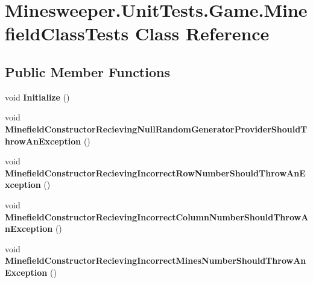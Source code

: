 \hypertarget{class_minesweeper_1_1_unit_tests_1_1_game_1_1_minefield_class_tests}{\section{Minesweeper.\+Unit\+Tests.\+Game.\+Minefield\+Class\+Tests Class Reference}
\label{class_minesweeper_1_1_unit_tests_1_1_game_1_1_minefield_class_tests}
}
\subsection*{Public Member Functions}
\begin{DoxyCompactItemize}
\item 
\hypertarget{class_minesweeper_1_1_unit_tests_1_1_game_1_1_minefield_class_tests_a052364795ce9d9654108dafa6000f8b9}{void {\bfseries Initialize} ()}\label{class_minesweeper_1_1_unit_tests_1_1_game_1_1_minefield_class_tests_a052364795ce9d9654108dafa6000f8b9}

\item 
\hypertarget{class_minesweeper_1_1_unit_tests_1_1_game_1_1_minefield_class_tests_a85afc5fac3afefecd08fc1af0a3e3ac7}{void {\bfseries Minefield\+Constructor\+Recieving\+Null\+Random\+Generator\+Provider\+Should\+Throw\+An\+Exception} ()}\label{class_minesweeper_1_1_unit_tests_1_1_game_1_1_minefield_class_tests_a85afc5fac3afefecd08fc1af0a3e3ac7}

\item 
\hypertarget{class_minesweeper_1_1_unit_tests_1_1_game_1_1_minefield_class_tests_af73a594d83efcadb361e48fdb7254415}{void {\bfseries Minefield\+Constructor\+Recieving\+Incorrect\+Row\+Number\+Should\+Throw\+An\+Exception} ()}\label{class_minesweeper_1_1_unit_tests_1_1_game_1_1_minefield_class_tests_af73a594d83efcadb361e48fdb7254415}

\item 
\hypertarget{class_minesweeper_1_1_unit_tests_1_1_game_1_1_minefield_class_tests_a1e5e4ae4759228570a0af96fb1d1845f}{void {\bfseries Minefield\+Constructor\+Recieving\+Incorrect\+Column\+Number\+Should\+Throw\+An\+Exception} ()}\label{class_minesweeper_1_1_unit_tests_1_1_game_1_1_minefield_class_tests_a1e5e4ae4759228570a0af96fb1d1845f}

\item 
\hypertarget{class_minesweeper_1_1_unit_tests_1_1_game_1_1_minefield_class_tests_a91a4494bbf4cf458e92ec87392029037}{void {\bfseries Minefield\+Constructor\+Recieving\+Incorrect\+Mines\+Number\+Should\+Throw\+An\+Exception} ()}\label{class_minesweeper_1_1_unit_tests_1_1_game_1_1_minefield_class_tests_a91a4494bbf4cf458e92ec87392029037}


\end{DoxyCompactItemize}
